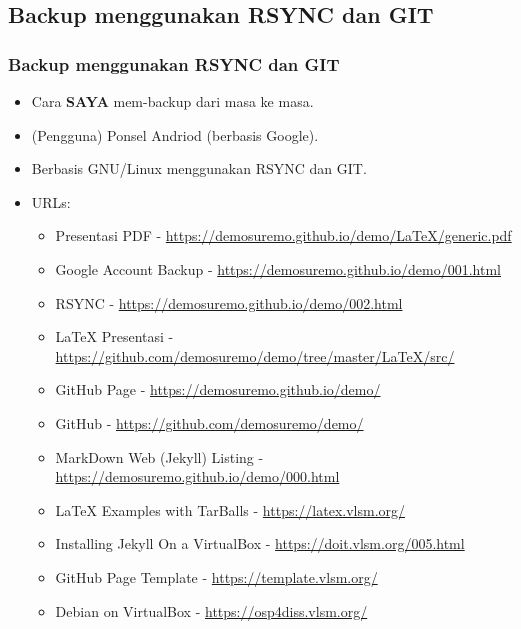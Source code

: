 \documentclass[xcolor=table, notheorems, hyperref={pdfpagelabels=false}]{beamer}
\begin{document}
\begin{frame}[fragile]
\section{Backup menggunakan RSYNC dan GIT}
\frametitle{Backup menggunakan RSYNC dan GIT}
\begin{itemize}
\item Cara \textbf{SAYA} mem-backup dari masa ke masa.
\item (Pengguna) Ponsel Andriod (berbasis Google).
\item Berbasis GNU/Linux menggunakan RSYNC dan GIT.
\item URLs:
\begin{itemize}
\item Presentasi PDF - {\scriptsize \url{https://demosuremo.github.io/demo/LaTeX/generic.pdf}}
\item Google Account Backup - {\scriptsize \url{https://demosuremo.github.io/demo/001.html}}
\item RSYNC - {\scriptsize \url{https://demosuremo.github.io/demo/002.html}}
\item LaTeX Presentasi - {\tiny \url{https://github.com/demosuremo/demo/tree/master/LaTeX/src/}}
\item GitHub Page - \url{https://demosuremo.github.io/demo/}
\item GitHub - \url{https://github.com/demosuremo/demo/}
\item MarkDown Web (Jekyll) Listing - {\tiny \url{https://demosuremo.github.io/demo/000.html}}
\item LaTeX Examples with TarBalls - \url{https://latex.vlsm.org/}
\item Installing Jekyll On a VirtualBox  {\scriptsize - \url{https://doit.vlsm.org/005.html}}
\item GitHub Page Template - \url{https://template.vlsm.org/}
\item Debian on VirtualBox - \url{https://osp4diss.vlsm.org/}
\end{itemize}
\end{itemize}
\end{frame}
\end{document}
